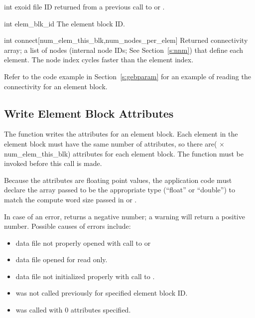 \begin{parameters}
\item[{int exoid \R{}}]
\exo{} file ID returned from a previous call to  
or .

\item[{int elem_blk_id \R{}}]
The element block ID.

\item[{int connect[num_elem_this_blk,num_nodes_per_elem] \W{}}]
Returned connectivity array; a list of nodes (internal node 
IDs; See Section~\ref{s:nnm}) that define each element. The 
node index cycles faster than the element index.
\end{parameters}

Refer to the code example in Section~\ref{s:gebparam} for an example
of reading the connectivity for an element block.


\subsection{Write Element Block Attributes}

The function  writes the attributes for an
element block. Each element in the element block must have the same
number of attributes, so there are( $\times$
{num_elem_this_blk}) attributes for each element block. The
function  must be invoked before this call
is made.

Because the attributes are floating point values, the application code
must declare the array passed to be the appropriate type (``float'' or
``double'') to match the compute word size passed in
 or .

In case of an error,  returns a negative
number; a warning will return a positive number. Possible causes of
errors include:

\begin{itemize}

 \item data file not properly opened with call to  
or 

 \item data file opened for read only.

 \item data file not initialized properly with call to
 .

 \item {} was not called previously for
 specified element block ID.

 \item {} was called with 0 attributes
 specified.
\end{itemize}

